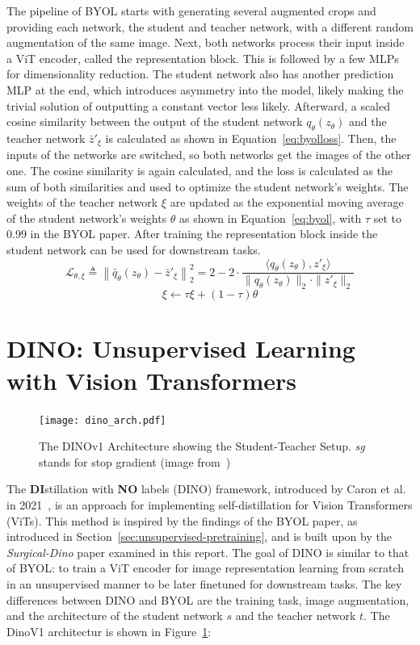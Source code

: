 The pipeline of BYOL starts with generating several augmented crops and providing each network, the student and teacher network, with a different random augmentation of the same image.
Next, both networks process their input inside a ViT encoder, called the representation block.
This is followed by a few MLPs for dimensionality reduction.
The student network also has another prediction MLP at the end, which introduces asymmetry into the model, likely making the trivial solution of outputting a constant vector less likely.
Afterward, a scaled cosine similarity between the output of the student network $q_{\theta}(z_{\theta})$ and the teacher network $\bar{z}'_{\xi}$ is calculated as shown in Equation~\ref{eq:byolloss}.
Then, the inputs of the networks are switched, so both networks get the images of the other one.
The cosine similarity is again calculated, and the loss is calculated as the sum of both similarities and used to optimize the student network's weights.
The weights of the teacher network $\xi$ are updated as the exponential moving average of the student network's weights $\theta$ as shown in Equation~\ref{eq:byol}, with $\tau$ set to 0.99 in the BYOL paper.
After training the representation block inside the student network can be used for downstream tasks.
\begin{equation}
    \mathcal{L}_{\theta, \xi} \triangleq \left\| \bar{q}_{\theta}(z_{\theta}) - \bar{z}'_{\xi} \right\|_2^2 = 2 - 2 \cdot \frac{\langle q_{\theta}(z_{\theta}), z'_{\xi} \rangle}{\| q_{\theta}(z_{\theta}) \|_2 \cdot \| z'_{\xi} \|_2}\label{eq:byolloss}
\end{equation}
\begin{equation}
    \xi \leftarrow \tau \xi + (1-\tau) \theta
    \label{eq:byol}
\end{equation}

\section{DINO: Unsupervised Learning with Vision Transformers}\label{sec:dino}
\begin{figure}
    \centering
    \texttt{[image: dino\_arch.pdf]}
    \caption[The DINOv1 Architecture]{The DINOv1 Architecture showing the Student-Teacher Setup. \emph{sg} stands for stop gradient (image from~\cite{Caron2021})}\label{fig:dinov1}
\end{figure}

The \textbf{DI}stillation with \textbf{NO} labels (DINO) framework, introduced by Caron et al. in 2021~\cite{Caron2021}, is an approach for implementing self-distillation for Vision Transformers (ViTs). This method is inspired by the findings of the BYOL paper, as introduced in Section~\ref{sec:unsupervised-pretraining}, and is built upon by the \emph{Surgical-Dino} paper examined in this report.
The goal of DINO is similar to that of BYOL: to train a ViT encoder for image representation learning from scratch in an unsupervised manner to be later finetuned for downstream tasks.
The key differences between DINO and BYOL are the training task, image augmentation, and the architecture of the student network $s$ and the teacher network $t$. The DinoV1 architectur is shown in Figure~\ref{fig:dinov1}:

